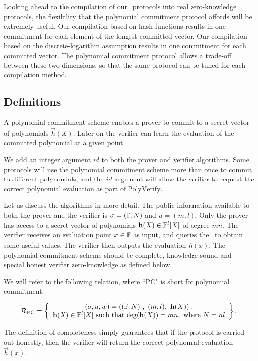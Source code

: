 Looking ahead to the compilation of our \ILC\ protocols into real zero-knowledge protocols, the flexibility that the polynomial commitment protocol affords will be extremely useful. Our compilation based on hash-functions results in one commitment for each element of the longest committed vector. Our compilation based on the discrete-logarithm assumption results in one commitment for each committed vector. The polynomial commitment protocol allows a trade-off between these two dimensions, so that the same protocol can be tuned for each compilation method.

\subsection{Definitions}
A polynomial commitment scheme enables a prover to commit to a secret vector of polynomials $\vec{h}(X)$. Later on the verifier can learn the evaluation of the committed polynomial at a given point.

We add an integer argument $id$ to both the prover and verifier algorithms. Some protocols will use the polynomial commitment scheme more than once to commit to different polynomials, and the $id$ argument will allow the verifier to request the correct polynomial evaluation as part of $\mathrm{PolyVerify}$.

Let us discuss the algorithms in more detail. The public information available to both the prover and the verifier is $\mathsf{\sigma} = (\mathbb{F},N)$ and $u = (m,l)$. Only the prover has access to a secret vector of polynomials $\mathbf{h}(X) \in \mathbb{F}^l[X]$ of degree $mn$. The verifier receives an evaluation point $x \in \mathbb{F}$ as input, and queries the \ILC\ to obtain some useful values. The verifier then outputs the evaluation $\vec{h}(x)$. The polynomial commitment scheme should be complete, knowledge-sound and special honest verifier zero-knowledge as defined below.

We will refer to the following relation, where ``PC" is short for polynomial commitment.

$$\mathcal{R}_{\textnormal{PC}}=\left\{\begin{array}{c}
(\mathsf{\sigma},u,w)=\left( (\mathbb{F},N)\ , \  (m,l) , \ \mathbf{h}(X) \right):\\
\mathbf{h}(X) \in \mathbb{F}^l[X] \text{ such that } \mathrm{deg}(\mathbf{h}(X)) = mn, \text{ where } N = nl
\end{array}\right\}.$$

The definition of completeness simply guarantees that if the protocol is carried out honestly, then the verifier will return the correct polynomial evaluation $\vec{h}(x)$.

